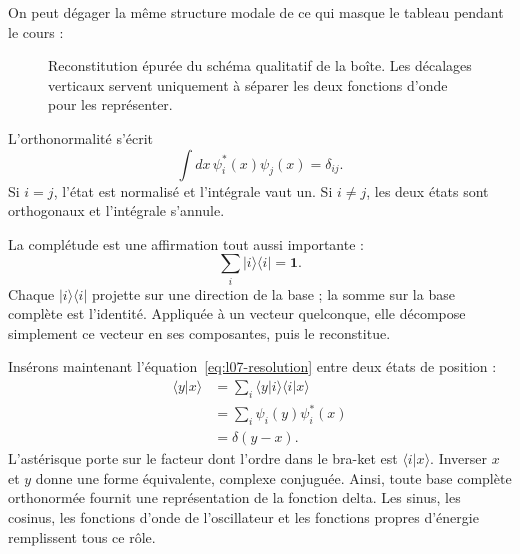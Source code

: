 On peut dégager la même structure modale de ce qui masque le tableau pendant le cours :
\begin{figure}[htbp]
\centering
{}
\caption{Reconstitution épurée du schéma qualitatif de la boîte. Les décalages verticaux servent uniquement à séparer les deux fonctions d’onde pour les représenter.}
\end{figure}

L’orthonormalité s’écrit
\begin{equation}
\int dx\,\psi_i^*(x)\psi_j(x)=\delta_{ij}.
\label{eq:l07-orthonormality}
\end{equation}
Si \(i=j\), l’état est normalisé et l’intégrale vaut un. Si \(i\ne j\), les deux états sont orthogonaux et l’intégrale s’annule.

La complétude est une affirmation tout aussi importante :
\begin{equation}
\sum_i |i\rangle\langle i|=\mathbf 1.
\label{eq:l07-resolution}
\end{equation}
Chaque \(|i\rangle\langle i|\) projette sur une direction de la base ; la somme sur la base complète est l’identité. Appliquée à un vecteur quelconque, elle décompose simplement ce vecteur en ses composantes, puis le reconstitue.

Insérons maintenant l’équation~\eqref{eq:l07-resolution} entre deux états de position :
\begin{align}
\langle y|x\rangle
&=\sum_i\langle y|i\rangle\langle i|x\rangle \\
&=\sum_i\psi_i(y)\psi_i^*(x) \\
&=\delta(y-x).
\label{eq:l07-position-completeness}
\end{align}
L’astérisque porte sur le facteur dont l’ordre dans le bra-ket est \(\langle i|x\rangle\). Inverser \(x\) et \(y\) donne une forme équivalente, complexe conjuguée. Ainsi, toute base complète orthonormée fournit une représentation de la fonction delta. Les sinus, les cosinus, les fonctions d’onde de l’oscillateur et les fonctions propres d’énergie remplissent tous ce rôle.

